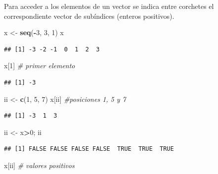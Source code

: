 \documentclass[]{book}
\newenvironment{Shaded}{\begin{snugshade}}{\end{snugshade}}
\newcommand{\KeywordTok}[1]{\textcolor[rgb]{0.13,0.29,0.53}{\textbf{#1}}}
\newcommand{\DecValTok}[1]{\textcolor[rgb]{0.00,0.00,0.81}{#1}}
\newcommand{\StringTok}[1]{\textcolor[rgb]{0.31,0.60,0.02}{#1}}
\newcommand{\CommentTok}[1]{\textcolor[rgb]{0.56,0.35,0.01}{\textit{#1}}}
\newcommand{\OperatorTok}[1]{\textcolor[rgb]{0.81,0.36,0.00}{\textbf{#1}}}
\newcommand{\NormalTok}[1]{#1}
\begin{document}
Para acceder a los elementos de un vector se indica entre corchetes el
correspondiente vector de subíndices (enteros positivos).

\begin{Shaded}
\begin{Highlighting}[]
\NormalTok{x <-}\StringTok{ }\KeywordTok{seq}\NormalTok{(}\OperatorTok{-}\DecValTok{3}\NormalTok{, }\DecValTok{3}\NormalTok{, }\DecValTok{1}\NormalTok{)}
\NormalTok{x}
\end{Highlighting}
\end{Shaded}

\begin{verbatim}
## [1] -3 -2 -1  0  1  2  3
\end{verbatim}

\begin{Shaded}
\begin{Highlighting}[]
\NormalTok{x[}\DecValTok{1}\NormalTok{] }\CommentTok{# primer elemento}
\end{Highlighting}
\end{Shaded}

\begin{verbatim}
## [1] -3
\end{verbatim}

\begin{Shaded}
\begin{Highlighting}[]
\NormalTok{ii <-}\StringTok{ }\KeywordTok{c}\NormalTok{(}\DecValTok{1}\NormalTok{, }\DecValTok{5}\NormalTok{, }\DecValTok{7}\NormalTok{)}
\NormalTok{x[ii] }\CommentTok{#posiciones 1, 5 y 7}
\end{Highlighting}
\end{Shaded}

\begin{verbatim}
## [1] -3  1  3
\end{verbatim}

\begin{Shaded}
\begin{Highlighting}[]
\NormalTok{ii <-}\StringTok{ }\NormalTok{x}\OperatorTok{>}\DecValTok{0}\NormalTok{; ii}
\end{Highlighting}
\end{Shaded}

\begin{verbatim}
## [1] FALSE FALSE FALSE FALSE  TRUE  TRUE  TRUE
\end{verbatim}

\begin{Shaded}
\begin{Highlighting}[]
\NormalTok{x[ii]  }\CommentTok{# valores positivos}
\end{Highlighting}
\end{Shaded}
\end{document}
